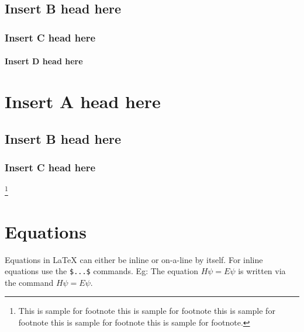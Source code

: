 \documentclass[journal=gmj]{CUP-JNL-DTM}%
\theoremstyle{definition}
\numberwithin{equation}{section}
\begin{document}
\subsection{Insert B head here}

\lipsum[2]

\subsubsection{Insert C head here}

\lipsum[3]

\paragraph{Insert D head here}

\lipsum[4]

\section{Insert A head here}
\subsection{Insert B head here}
\subsubsection{Insert C head here}
\lipsum[4]\footnote{This is sample for footnote this is sample for footnote this is sample for footnote  this is sample for footnote this is sample for footnote.}

\section{Equations}

Equations in \LaTeX{} can either be inline or on-a-line by itself. For
inline equations use the \verb+$...$+ commands. Eg: The equation
$H\psi = E \psi$ is written via the command $H \psi = E \psi$.
\end{document}
